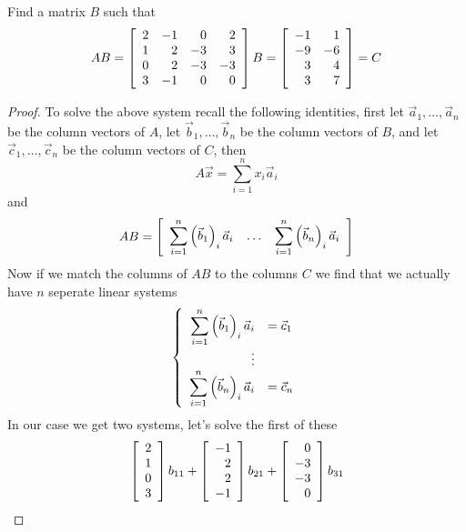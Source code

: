 \documentclass{tutorial}
\begin{document}
\begin{prob} Find a matrix $B$ such that
\[
    AB = \left[ \begin{array}{rrrr}
         2&-1& 0& 2\\
         1& 2&-3& 3\\
         0& 2&-3&-3\\
         3&-1& 0& 0
    \end{array} \right] B
     = \left[ \begin{array}{rr}
        -1& 1\\
        -9&-6\\
         3& 4\\
         3& 7
     \end{array} \right] = C
\]
\end{prob} \ifsolns \begin{proof}
To solve the above system recall the following identities, first let $\vec{a}_1, \dots, \vec{a}_n$ be the column vectors of $A$, let $\vec{b}_1, \dots, \vec{b}_n$ be the column vectors of $B$, and let $\vec{c}_1, \dots, \vec{c}_n$ be the column vectors of $C$, then
\[
    A\vec{x} = \sum_{i=1}^n x_i \vec{a}_i
\]
and
\[
    AB = \left[ \begin{array}{c|c|c} 
        \displaystyle\sum_{i=1}^n \left( \vec{b}_1 \right)_i \vec{a}_i
        & \dots &
        \displaystyle\sum_{i=1}^n \left( \vec{b}_n \right)_i \vec{a}_i
    \end{array} \right]
\]
Now if we match the columns of $AB$ to the columns $C$ we find that we actually have $n$ seperate linear systems
\[
    \left\{ \begin{array}{rl}
        \displaystyle\sum_{i=1}^n \left( \vec{b}_1 \right)_i \vec{a}_i &= \vec{c}_1 \\
        \vdots \\
        \displaystyle\sum_{i=1}^n \left( \vec{b}_n \right)_i \vec{a}_i &= \vec{c}_n
    \end{array} \right.
\]
In our case we get two systems, let's solve the first of these
\[
      \left[ \begin{array}{r} 2 \\ 1 \\ 0 \\ 3 \end{array} \right] b_{11}
    + \left[ \begin{array}{r}-1 \\ 2 \\ 2 \\-1 \end{array} \right] b_{21}
    + \left[ \begin{array}{r} 0 \\-3 \\-3 \\ 0 \end{array} \right] b_{31}
\]
\end{proof}
\end{document}
